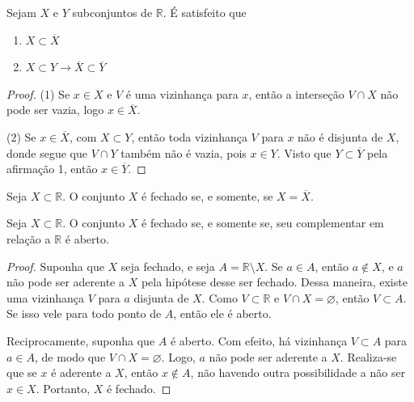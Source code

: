 \begin{prop:fecho e inclusao}
Sejam $X$ e $Y$ subconjuntos de $\mathbb{R}$. É satisfeito que
\begin{enumerate}
	\item $X \subset \overline{X}$
	\item $X \subset Y \rightarrow \overline{X} \subset \overline{Y}$
\end{enumerate}
\begin{proof}
	(1) Se $x \in X$ e $V$ é uma vizinhança para $x$, então a interseção $V \cap X$ não
	pode ser vazia, logo $x \in \overline{X}$.

	(2) Se $x\in \overline{X}$, com $X \subset Y$, então toda vizinhança
	$V$ para $x$ não é disjunta de $X$, donde segue que $V \cap Y$ também não é vazia,
	pois $x \in Y$. Visto que $Y \subset \overline{Y}$ pela afirmação 1, então
	$x \in \overline{Y}$.
\end{proof}
\end{prop:fecho e inclusao}

\begin{def:fechado}
Seja $X \subset \mathbb{R}$. O conjunto $X$ é fechado se, e somente, se
$X = \overline{X}$.
\end{def:fechado}
\noindent

\begin{prop:complementar aberto}
\label{prop:complementar aberto}
Seja $X \subset \mathbb{R}$. O conjunto $X$ é fechado se, e somente se,
seu complementar em relação a $\mathbb{R}$ é aberto.
\begin{proof}
	Suponha que $X$ seja fechado, e seja $A = \mathbb{R} \setminus X$.
	Se $a \in A$, então $a \notin X$, e $a$ não pode ser aderente a $X$ pela hipótese
	desse ser fechado. Dessa maneira, existe uma vizinhança $V$ para $a$ disjunta de $X$.
	Como $V \subset \mathbb{R}$ e $V \cap X = \varnothing$, então $V \subset A$. Se isso
	vele para todo ponto de $A$, então ele é aberto.

	Reciprocamente, suponha que $A$ é aberto. Com efeito, há vizinhança $V \subset A$ para
	$a \in A$, de modo que $V \cap X = \varnothing$. Logo, $a$ não pode ser aderente a $X$.
	Realiza-se que se $x$ é aderente a $X$, então $x \notin A$, não havendo outra
	possibilidade a não ser $x \in X$. Portanto, $X$ é fechado.
\end{proof}
\end{prop:complementar aberto}

